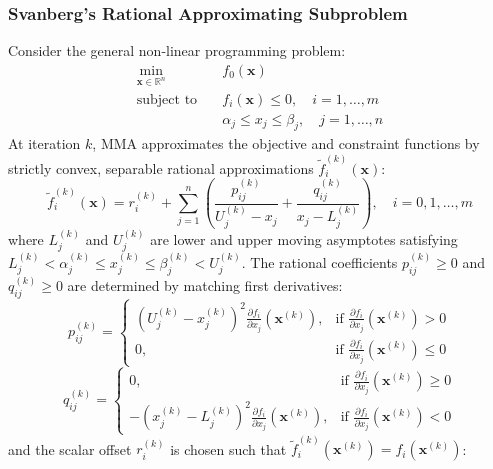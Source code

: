 \documentclass[11pt, a4paper]{article}
\begin{document}
\subsubsection{Svanberg's Rational Approximating Subproblem}
Consider the general non-linear programming problem:
\begin{equation}
\begin{aligned}
\min_{\mathbf{x} \in \mathbb{R}^n} \quad & f_0(\mathbf{x}) \\
\text{subject to} \quad & f_i(\mathbf{x}) \le 0, \quad i = 1, \dots, m \\
& \alpha_j \le x_j \le \beta_j, \quad j = 1, \dots, n
\end{aligned}
\end{equation}
At iteration $k$, MMA approximates the objective and constraint functions by strictly convex, separable rational approximations $\tilde{f}_i^{(k)}(\mathbf{x})$:
\begin{equation}
\tilde{f}_i^{(k)}(\mathbf{x}) = r_i^{(k)} + \sum_{j=1}^n \left( \frac{p_{ij}^{(k)}}{U_j^{(k)} - x_j} + \frac{q_{ij}^{(k)}}{x_j - L_j^{(k)}} \right), \quad i = 0, 1, \dots, m
\end{equation}
where $L_j^{(k)}$ and $U_j^{(k)}$ are lower and upper moving asymptotes satisfying $L_j^{(k)} < \alpha_j^{(k)} \le x_j^{(k)} \le \beta_j^{(k)} < U_j^{(k)}$.
The rational coefficients $p_{ij}^{(k)} \ge 0$ and $q_{ij}^{(k)} \ge 0$ are determined by matching first derivatives:
\begin{equation}
p_{ij}^{(k)} = \begin{cases}
\left( U_j^{(k)} - x_j^{(k)} \right)^2 \frac{\partial f_i}{\partial x_j}\left(\mathbf{x}^{(k)}\right), & \text{if } \frac{\partial f_i}{\partial x_j}\left(\mathbf{x}^{(k)}\right) > 0 \\[6pt]
0, & \text{if } \frac{\partial f_i}{\partial x_j}\left(\mathbf{x}^{(k)}\right) \le 0
\end{cases}
\end{equation}
\begin{equation}
q_{ij}^{(k)} = \begin{cases}
0, & \text{if } \frac{\partial f_i}{\partial x_j}\left(\mathbf{x}^{(k)}\right) \ge 0 \\[6pt]
- \left( x_j^{(k)} - L_j^{(k)} \right)^2 \frac{\partial f_i}{\partial x_j}\left(\mathbf{x}^{(k)}\right), & \text{if } \frac{\partial f_i}{\partial x_j}\left(\mathbf{x}^{(k)}\right) < 0
\end{cases}
\end{equation}
and the scalar offset $r_i^{(k)}$ is chosen such that $\tilde{f}_i^{(k)}(\mathbf{x}^{(k)}) = f_i(\mathbf{x}^{(k)})$:
\end{document}
